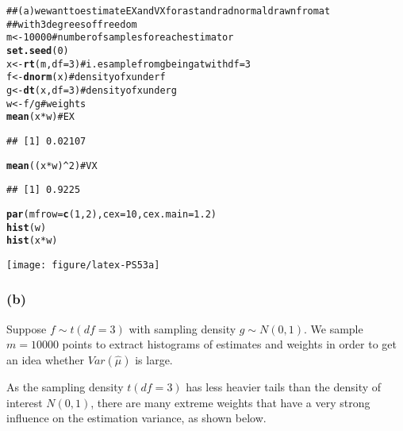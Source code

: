 \documentclass{article}\usepackage{graphicx, color}
\makeatletter
\def\maxwidth{ %
  \ifdim\Gin@nat@width>\linewidth
    \linewidth
  \else
    \Gin@nat@width
  \fi
}
\newcommand{\hlfunctioncall}[1]{\textcolor[rgb]{0.501960784313725,0,0.329411764705882}{\textbf{#1}}}%
\newcommand{\hlcomment}[1]{\textcolor[rgb]{0.180392156862745,0.6,0.341176470588235}{#1}}%
\newenvironment{kframe}{%
 \def\at@end@of@kframe{}%
 \ifinner\ifhmode%
  \def\at@end@of@kframe{\end{minipage}}%
  \begin{minipage}{\columnwidth}%
 \fi\fi%
 \def\FrameCommand##1{\hskip\@totalleftmargin \hskip-\fboxsep
 \colorbox{shadecolor}{##1}\hskip-\fboxsep
     \hskip-\linewidth \hskip-\@totalleftmargin \hskip\columnwidth}%
 \MakeFramed {\advance\hsize-\width
   \@totalleftmargin\z@ \linewidth\hsize
   \@setminipage}}%
 {\par\unskip\endMakeFramed%
 \at@end@of@kframe}
\newenvironment{knitrout}{}{} %
\makeatother
\begin{document}
\begin{knitrout}
\color{fgcolor}\begin{kframe}
\begin{alltt}
\hlcomment{## (a) we want to estimate EX and VX for a standrad normal drawn from a t}
\hlcomment{## with 3 degrees of freedom}
m <- 10000  \hlcomment{# number of samples for each estimator}
\hlfunctioncall{set.seed}(0)
x <- \hlfunctioncall{rt}(m, df = 3)  \hlcomment{# i.e sample from g being a t with df=3}
f <- \hlfunctioncall{dnorm}(x)  \hlcomment{# density of x under f}
g <- \hlfunctioncall{dt}(x, df = 3)  \hlcomment{# density of x under g}
w <- f/g  \hlcomment{# weights}
\hlfunctioncall{mean}(x * w)  \hlcomment{#EX}
\end{alltt}
\begin{verbatim}
## [1] 0.02107
\end{verbatim}
\begin{alltt}
\hlfunctioncall{mean}((x * w)^2)  \hlcomment{#VX}
\end{alltt}
\begin{verbatim}
## [1] 0.9225
\end{verbatim}
\begin{alltt}

\hlfunctioncall{par}(mfrow = \hlfunctioncall{c}(1, 2), cex = 10, cex.main = 1.2)
\hlfunctioncall{hist}(w)
\hlfunctioncall{hist}(x * w)
\end{alltt}
\end{kframe}

{\centering \texttt{[image: figure/latex-PS53a]} 

}



\end{knitrout}


\subsubsection*{(b)}
\hspace{12 pt} Suppose $f\sim t(df=3)$ with sampling density $g\sim N(0,1)$. We sample $m=10000$ points
to extract histograms of estimates and weights in order to get an idea whether $Var(\hat\mu)$ is large.

As the sampling density $t(df=3)$ has less heavier tails than the density of interest $N(0,1)$, there are
many extreme weights that have a very strong influence on the estimation variance, as shown below.
\end{document}
